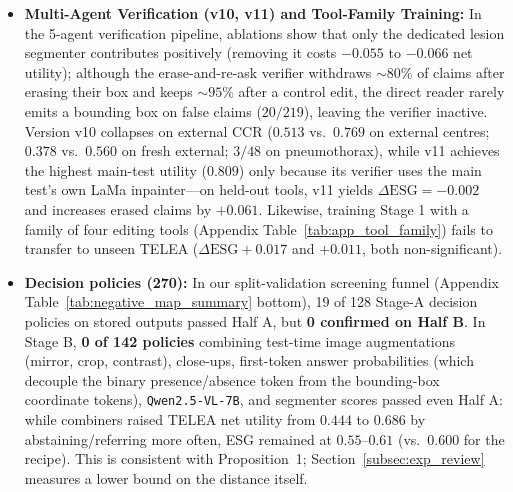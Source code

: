 \documentclass[5p,times,twocolumn,authoryear]{elsarticle}
\begin{document}
\begin{itemize}[leftmargin=*,nosep]
    \item \textbf{Multi-Agent Verification (v10, v11) and Tool-Family Training:} In the 5-agent verification pipeline, ablations show that only the dedicated lesion segmenter contributes positively (removing it costs $-0.055$ to $-0.066$ net utility); although the erase-and-re-ask verifier withdraws $\sim 80\%$ of claims after erasing their box and keeps $\sim 95\%$ after a control edit, the direct reader rarely emits a bounding box on false claims ($20/219$), leaving the verifier inactive. Version v10 collapses on external CCR ($0.513$ vs.\ $0.769$ on external centres; $0.378$ vs.\ $0.560$ on fresh external; $3/48$ on pneumothorax), while v11 achieves the highest main-test utility ($0.809$) only because its verifier uses the main test's own LaMa inpainter---on held-out tools, v11 yields $\Delta\text{ESG} = -0.002$ and increases erased claims by $+0.061$. Likewise, training Stage 1 with a family of four editing tools (Appendix Table~\ref{tab:app_tool_family}) fails to transfer to unseen TELEA ($\Delta\text{ESG} +0.017$ and $+0.011$, both non-significant).
    \item \textbf{Decision policies (270):} In our split-validation screening funnel (Appendix Table~\ref{tab:negative_map_summary} bottom), 19 of 128 Stage-A decision policies on stored outputs passed Half A, but \textbf{0 confirmed on Half B}. In Stage B, \textbf{0 of 142 policies} combining test-time image augmentations (mirror, crop, contrast), close-ups, first-token answer probabilities (which decouple the binary presence/absence token from the bounding-box coordinate tokens), \texttt{Qwen2.5-VL-7B}, and segmenter scores passed even Half A: while combiners raised TELEA net utility from $0.444$ to $0.686$ by abstaining/referring more often, ESG remained at $0.55\text{--}0.61$ (vs.\ $0.600$ for the recipe). This is consistent with Proposition~1; Section~\ref{subsec:exp_review} measures a lower bound on the distance itself.
\end{itemize}
\end{document}
